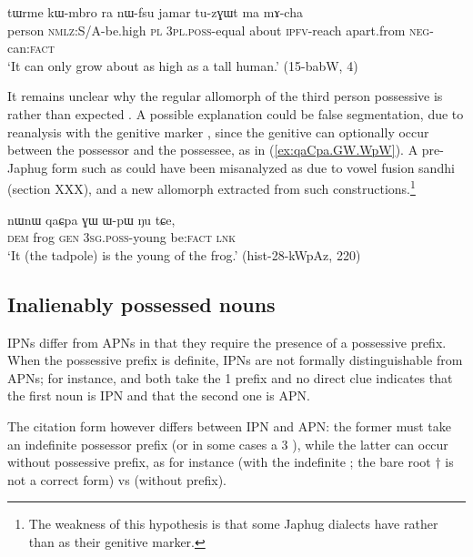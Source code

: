 \begin{exe}
\ex \label{ex:nWfsu}
\gll tɯrme kɯ-mbro ra nɯ-fsu jamar tu-zɣɯt ma mɤ-cha \\
person \textsc{nmlz}:S/A-be.high \textsc{pl}  \textsc{3pl.poss}-equal about \textsc{ipfv}-reach apart.from \textsc{neg}-can:\textsc{fact} \\
\glt `It can only grow about as high as a tall human.' (15-babW, 4)
\end{exe}


It remains unclear why the regular allomorph of the third person possessive is  rather than expected . A possible explanation could be false segmentation, due to reanalysis with the genitive marker , since the genitive can optionally occur between the possessor and the possessee, as in (\ref{ex:qaCpa.GW.WpW}). A pre-Japhug form such as  could have been misanalyzed as  due to vowel fusion sandhi (section XXX), and a new allomorph  extracted from such constructions.\footnote{The weakness of this hypothesis is that some Japhug dialects have  rather than  as their genitive marker.}

\begin{exe}
\ex \label{ex:qaCpa.GW.WpW}
 \gll nɯnɯ qaɕpa ɣɯ ɯ-pɯ ŋu tɕe, \\
 \textsc{dem} frog \textsc{gen} \textsc{3sg.poss}-young be:\textsc{fact} \textsc{lnk} \\
 \glt `It (the tadpole) is the young of the frog.' (hist-28-kWpAz, 220)
\end{exe} 


\subsection{Inalienably possessed nouns} \label{sec:inalienably.possessed}
IPNs differ from APNs in that they require the presence of a possessive prefix.  When the possessive prefix is definite, IPNs are not formally distinguishable from APNs; for instance,  and  both take the 1\sg{}  prefix and no direct clue indicates that the first noun is IPN and that the second one is APN.

The citation form however differs between IPN and APN: the former must take an indefinite possessor prefix (or in some cases a 3\sg{} ), while the latter can occur without possessive prefix, as for instance  (with the indefinite ; the bare root $\dagger$ is not a correct form) vs  (without prefix).

